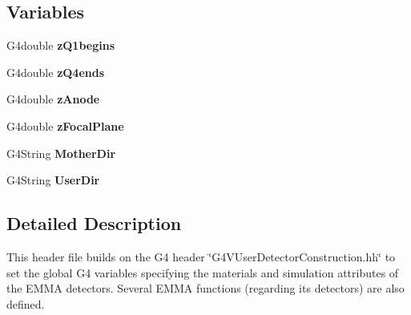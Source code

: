 \subsection*{Variables}
\begin{DoxyCompactItemize}
\item 
\hypertarget{EMMADetectorConstruction_8hh_a63b4d37f848ab857400025988ebc68ac}{G4double {\bfseries z\-Q1begins}}\label{EMMADetectorConstruction_8hh_a63b4d37f848ab857400025988ebc68ac}

\item 
\hypertarget{EMMADetectorConstruction_8hh_aaefdf69418ceee3aabc72a346eef1799}{G4double {\bfseries z\-Q4ends}}\label{EMMADetectorConstruction_8hh_aaefdf69418ceee3aabc72a346eef1799}

\item 
\hypertarget{EMMADetectorConstruction_8hh_a9906ccfd8985bb28a72c37e7cd16f277}{G4double {\bfseries z\-Anode}}\label{EMMADetectorConstruction_8hh_a9906ccfd8985bb28a72c37e7cd16f277}

\item 
\hypertarget{EMMADetectorConstruction_8hh_a499096b9dc56ffa559bd1aec0bafe28e}{G4double {\bfseries z\-Focal\-Plane}}\label{EMMADetectorConstruction_8hh_a499096b9dc56ffa559bd1aec0bafe28e}

\item 
\hypertarget{EMMADetectorConstruction_8hh_a28a3faf9b4768b420044f0d81fa645b7}{G4\-String {\bfseries Mother\-Dir}}\label{EMMADetectorConstruction_8hh_a28a3faf9b4768b420044f0d81fa645b7}

\item 
\hypertarget{EMMADetectorConstruction_8hh_a8558631b93942e4ae79b3feb21c97c8f}{G4\-String {\bfseries User\-Dir}}\label{EMMADetectorConstruction_8hh_a8558631b93942e4ae79b3feb21c97c8f}

\end{DoxyCompactItemize}


\subsection{Detailed Description}
This header file builds on the G4 header \char`\"{}\-G4\-V\-User\-Detector\-Construction.\-hh\char`\"{} to set the global G4 variables specifying the materials and simulation attributes of the E\-M\-M\-A detectors. Several E\-M\-M\-A functions (regarding its detectors) are also defined. 